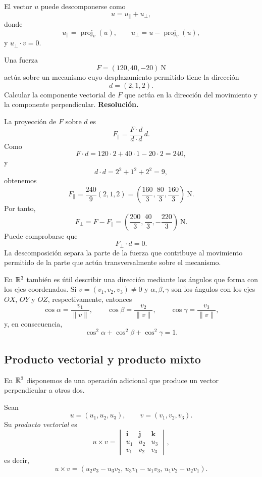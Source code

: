 El vector $u$ puede descomponerse como
\[
u=u_{\parallel}+u_{\perp},
\]
donde
\[
u_{\parallel}=\operatorname{proj}_v(u),
\qquad
u_{\perp}=u-\operatorname{proj}_v(u),
\]
y $u_{\perp}\cdot v=0$.

\begin{solvedexercise}
Una fuerza
\[
F=(120,40,-20)\ \mathrm{N}
\]
actúa sobre un mecanismo cuyo desplazamiento permitido tiene la dirección
\[
d=(2,1,2).
\]
Calcular la componente vectorial de $F$ que actúa en la dirección del movimiento y la componente perpendicular.
\tcblower
\textbf{Resolución.}\par\smallskip
La proyección de $F$ sobre $d$ es
\[
F_{\parallel}
=\frac{F\cdot d}{d\cdot d}\,d.
\]
Como
\[
F\cdot d=120\cdot2+40\cdot1-20\cdot2=240,
\]
y
\[
d\cdot d=2^2+1^2+2^2=9,
\]
obtenemos
\[
F_{\parallel}=\frac{240}{9}(2,1,2)
=\left(\frac{160}{3},\frac{80}{3},\frac{160}{3}\right)\ \mathrm{N}.
\]
Por tanto,
\[
F_{\perp}=F-F_{\parallel}
=\left(\frac{200}{3},\frac{40}{3},-\frac{220}{3}\right)\ \mathrm{N}.
\]
Puede comprobarse que
\[
F_{\perp}\cdot d=0.
\]
La descomposición separa la parte de la fuerza que contribuye al movimiento permitido de la parte que actúa transversalmente sobre el mecanismo.
\end{solvedexercise}

En $\mathbb{R}^3$ también es útil describir una dirección mediante los ángulos que forma con los ejes coordenados. Si $v=(v_1,v_2,v_3)\neq0$ y $\alpha,\beta,\gamma$ son los ángulos con los ejes $OX$, $OY$ y $OZ$, respectivamente, entonces
\[
\cos\alpha=\frac{v_1}{\|v\|},
\qquad
\cos\beta=\frac{v_2}{\|v\|},
\qquad
\cos\gamma=\frac{v_3}{\|v\|},
\]
y, en consecuencia,
\[
\cos^2\alpha+\cos^2\beta+\cos^2\gamma=1.
\]

\subsection{Producto vectorial y producto mixto}

En $\mathbb{R}^3$ disponemos de una operación adicional que produce un vector perpendicular a otros dos.

\begin{definition}
Sean
\[
u=(u_1,u_2,u_3),\qquad v=(v_1,v_2,v_3).
\]
Su \emph{producto vectorial} es
\[
u\times v=
\begin{vmatrix}
\mathbf i&\mathbf j&\mathbf k\\
u_1&u_2&u_3\\
v_1&v_2&v_3
\end{vmatrix},
\]
es decir,
\[
u\times v
=
(u_2v_3-u_3v_2,\,
 u_3v_1-u_1v_3,\,
 u_1v_2-u_2v_1).
\]
\end{definition}

